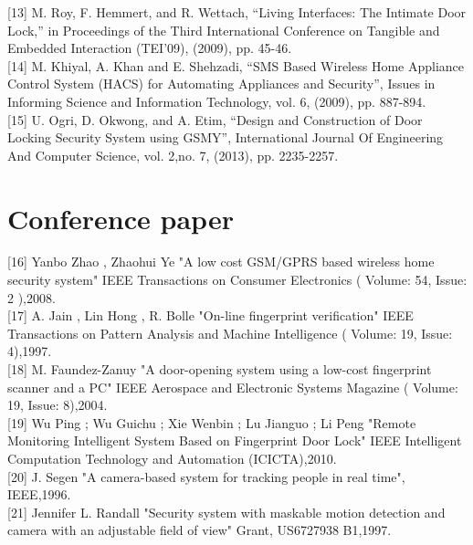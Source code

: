 \documentclass[twoside,a4paper,16pt]{book}
\begin{document}
{{			[13]	M. Roy, F. Hemmert, and R. Wettach, “Living Interfaces: The Intimate Door Lock,” in Proceedings of the Third International Conference on Tangible and Embedded Interaction (TEI'09), (2009), pp. 45-46.\\
			
			[14]	M. Khiyal, A. Khan and E. Shehzadi, “SMS Based Wireless Home Appliance Control System (HACS) for Automating Appliances and Security”, Issues in Informing Science and Information Technology, vol. 6, (2009), pp. 887-894.\\
			
			[15]	U. Ogri, D. Okwong, and A. Etim, “Design and Construction of Door Locking Security System using GSMY”, International Journal Of Engineering And Computer Science, vol. 2,no. 7, (2013), pp. 2235-2257.\\
			
			
			
			
			\section{Conference paper}
			
			
			[16]	Yanbo Zhao ,  Zhaohui Ye "A low cost GSM/GPRS based wireless home security system" IEEE Transactions on Consumer Electronics ( Volume: 54, Issue: 2 ),2008.\\
			
			{[17]}	A. Jain , Lin Hong , R. Bolle "On-line fingerprint verification" IEEE Transactions on Pattern Analysis and Machine Intelligence ( Volume: 19, Issue: 4),1997.\\
			
			{[18]}	M. Faundez-Zanuy "A door-opening system using a low-cost fingerprint scanner and a PC" IEEE Aerospace and Electronic Systems Magazine ( Volume: 19, Issue: 8),2004.\\
			
			{[19]}	Wu Ping ;  Wu Guichu ;  Xie Wenbin ;  Lu Jianguo ;  Li Peng "Remote Monitoring Intelligent System Based on Fingerprint Door Lock" IEEE Intelligent Computation Technology and Automation (ICICTA),2010.\\
			
			{[20]}	J. Segen "A camera-based system for tracking people in real time", IEEE,1996.\\
			
			{[21]}	Jennifer L. Randall "Security system with maskable motion detection and camera with an adjustable field of view" Grant, US6727938 B1,1997.\\
			
}}
\end{document}
